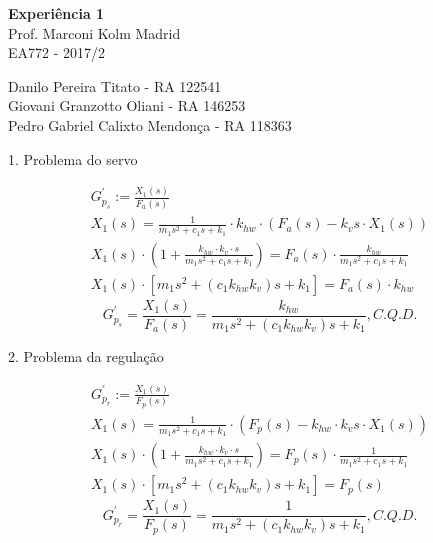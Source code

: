 \documentclass[a4paper,11pt]{article}
\begin{document}
\begin{center}
\textbf{Experiência 1}\\ \hspace{5pt}Prof. Marconi Kolm Madrid\\EA772 - 2017/2
\end{center}

\begin{center}
Danilo Pereira Titato - RA 122541\\
Giovani Granzotto Oliani - RA 146253\\
Pedro Gabriel Calixto Mendonça - RA 118363\\
\end{center}

1. Problema do servo

\begin{gather*}
    G^\prime_{p_s} := \frac{X_1 \left( s \right)}{F_a \left( s \right)} \\
    X_{1} \left( s \right) = \frac{1}{m_1s^2 + c_1s + k_1} \cdot k_{hw} \cdot
        \left( F_a \left( s \right) - k_vs \cdot X_1 \left( s \right) \right) \\
    X_{1} \left( s \right) \cdot \left( 1 + \frac{k_{hw} \cdot k_v \cdot s}
        {m_1s^2 + c_1s + k_1} \right) = F_a\left( s \right) \cdot
        \frac{k_{hw}}{m_1s^2 + c_1s + k_1} \\
    X_{1} \left( s \right) \cdot \left[ m_1s^2 + \left( c_1 k_{hw} k_v \right) s
        + k_1 \right] = F_a\left( s \right) \cdot k_{hw}
\end{gather*}
\begin{equation}
    \label{eq:Gps}
    G^\prime_{p_s} = \frac{X_{1}\left( s \right)}{F_a\left( s \right)} =
         \frac{k_{hw}}{m_1s^2 + \left( c_1 k_{hw} k_v \right) s + k_1},
         C.Q.D.
\end{equation}

2. Problema da regulação

\begin{gather*}
    G^\prime_{p_r} := \frac{X_1 \left( s \right)}{F_p \left( s \right)} \\
    X_{1} \left( s \right) = \frac{1}{m_1s^2 + c_1s + k_1} \cdot \left(
        F_p\left( s \right) - k_{hw} \cdot k_vs \cdot X_1 \left( s \right)
        \right) \\
    X_{1} \left( s \right) \cdot \left( 1 + \frac{k_{hw} \cdot k_v \cdot s}
        {m_1s^2 + c_1s + k_1} \right) = F_p \left( s \right) \cdot
        \frac{1}{m_1s^2 + c_1s + k_1} \\
    X_{1} \left( s \right) \cdot \left[ m_1s^2 + \left( c_1 k_{hw} k_v \right) s
        + k_1 \right] = F_p\left( s \right)
\end{gather*}
\begin{equation}
    \label{eq:Gpr}
    G^\prime_{p_r} = \frac{X_{1}\left( s \right)}{F_p\left( s \right)} =
         \frac{1}{m_1s^2 + \left( c_1 k_{hw} k_v \right) s + k_1}, C.Q.D.
\end{equation}
\end{document}
